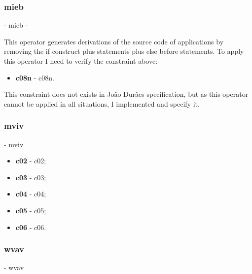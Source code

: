 	\hypertarget{mieb}{}
	\subsubsection{\textbf{\acs{mieb}}} - \Acl{mieb} - 

	This operator generates derivations of the source code of applications by removing the if construct plus statements plus else before statements. To apply this operator I need to verify the constraint above:
	\begin{itemize}
		\item \textbf{\acs{c08n}} - \Acl{c08n}.
	\end{itemize}
	This constraint does not exists in João Durães specification, but as this operator cannot be applied in all situations, I implemented and specify it.

	\hypertarget{mviv}{}
	\subsubsection{\textbf{\acs{mviv}}} - \Acl{mviv}

	\begin{itemize}
		\item \textbf{\acs{c02}} - \Acl{c02};
		\item \textbf{\acs{c03}} - \Acl{c03};
		\item \textbf{\acs{c04}} - \Acl{c04};
		\item \textbf{\acs{c05}} - \Acl{c05};
		\item \textbf{\acs{c06}} - \Acl{c06}.
	\end{itemize}


	\hypertarget{wvav}{}
	\subsubsection{\textbf{\acs{wvav}}} - \Acl{wvav}

